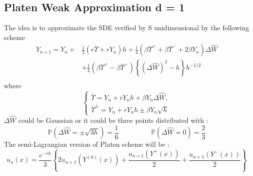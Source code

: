 \documentclass[]{beamer}
\begin{document}
\subsection*{Platen Weak Approximation d = 1}
\begin{frame}
The idea is to approximate the SDE verified by S unidimensional by the following scheme
\begin{equation*}
\begin{split}
Y_{n+1}=Y_n+&\frac{1}{2}(r\bar{\Upsilon}+rY_n)h+\frac{1}{4}(\beta\bar{\Upsilon}^+ + \beta\bar{\Upsilon}^-+2\beta Y_n)\Delta\hat{W}\\
&+\frac{1}{4}(\beta\bar{\Upsilon}^+ - \beta\bar{\Upsilon}^-)\left\lbrace(\Delta \hat{W})^2-h \right\rbrace h^{-1/2}\\
\end{split}
\end{equation*}
where 
\begin{equation*}
\left\lbrace
\begin{array}{l}
\bar{\Upsilon}=Y_n + rY_nh + \beta Y_n \Delta \hat{W}, \\
\bar{\Upsilon}^{\pm}=Y_n + rY_nh \pm \beta Y_n \sqrt{h}
\end{array}
\right.
\end{equation*}
$\Delta\hat{W}$ could be Gaussian or it could be three points distributed with :
\begin{equation*}
\mathbb{P}(\Delta\hat{W}=\pm \sqrt{3h})=\frac{1}{6} \hspace{2cm} \mathbb{P}(\Delta\hat{W}=0)=\frac{2}{3} 
\end{equation*}
The semi-Lagrangian version of Platen scheme will be : 
\begin{equation*}
u_n(x) = \frac{e^{-rh}}{3}\left\lbrace2u_{n+1}(Y^{(0)}(x))+ \frac{u_{n+1}(Y^{+}(x))}{2}+ \frac{u_{n+1}(Y^{-}(x))}{2}\right\rbrace
\end{equation*}
\end{frame}
\end{document}
